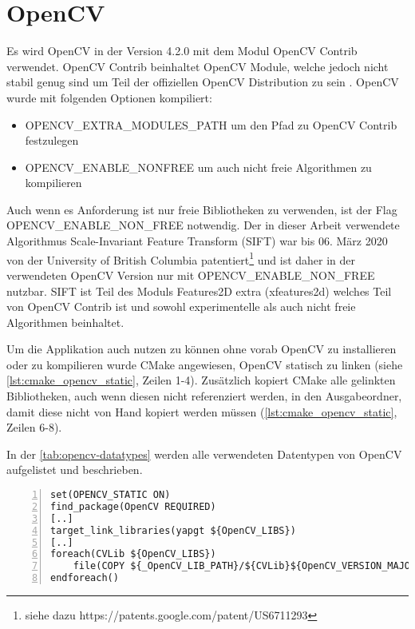 \section{OpenCV}\label{sec:opencv}
Es wird OpenCV in der Version 4.2.0 mit dem Modul OpenCV Contrib verwendet.
OpenCV Contrib beinhaltet OpenCV Module, welche jedoch nicht stabil genug sind um Teil der offiziellen OpenCV Distribution zu sein \cite[README.md]{opencv_2013}.
OpenCV wurde mit folgenden Optionen kompiliert:
\begin{itemize}
	\item OPENCV\_EXTRA\_MODULES\_PATH um den Pfad zu OpenCV Contrib festzulegen
	\item OPENCV\_ENABLE\_NONFREE um auch nicht freie Algorithmen zu kompilieren
\end{itemize}
Auch wenn es Anforderung ist nur freie Bibliotheken zu verwenden, ist der Flag OPENCV\_ENABLE\_NON\_FREE notwendig.
Der in dieser Arbeit verwendete Algorithmus Scale-Invariant Feature Transform (SIFT) war bis 06. März 2020 von der University of British Columbia patentiert\footnote{siehe dazu https://patents.google.com/patent/US6711293} und ist daher in der verwendeten OpenCV Version nur mit OPENCV\_ENABLE\_NON\_FREE nutzbar.
SIFT ist Teil des Moduls Features2D extra (xfeatures2d) welches Teil von OpenCV Contrib ist und sowohl experimentelle als auch nicht freie Algorithmen beinhaltet.

Um die Applikation auch nutzen zu können ohne vorab OpenCV zu installieren oder zu kompilieren wurde CMake angewiesen, OpenCV statisch zu linken (siehe \autoref{lst:cmake_opencv_static}, Zeilen 1-4).
Zusätzlich kopiert CMake alle gelinkten Bibliotheken, auch wenn diesen nicht referenziert werden, in den Ausgabeordner, damit diese nicht von Hand kopiert werden müssen (\autoref{lst:cmake_opencv_static}, Zeilen 6-8).

In der \autoref{tab:opencv-datatypes} werden alle verwendeten Datentypen von OpenCV aufgelistet und beschrieben.

\begin{lstlisting}[numbers=left, breaklines=true,breakatwhitespace=false,label=lst:cmake_opencv_static, caption=Ausschnitt von CMakeLists.txt um OpenCV statisch zu linken]
set(OPENCV_STATIC ON)
find_package(OpenCV REQUIRED)
[..]
target_link_libraries(yapgt ${OpenCV_LIBS})
[..]
foreach(CVLib ${OpenCV_LIBS})
    file(COPY ${_OpenCV_LIB_PATH}/${CVLib}${OpenCV_VERSION_MAJOR}${OpenCV_VERSION_MINOR}${OpenCV_VERSION_PATCH}d.dll DESTINATION ${CMAKE_BINARY_DIR})
endforeach()
\end{lstlisting}


